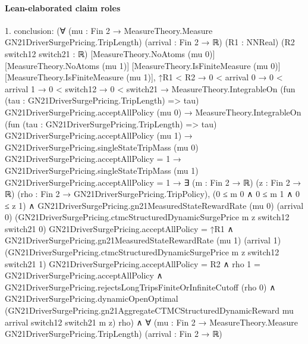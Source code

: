 \documentclass[10pt]{article}
\begin{document}
\paragraph{Lean-elaborated claim roles}\begin{ReviewVerbatim}
1. conclusion: (∀ (mu : Fin 2 → MeasureTheory.Measure GN21DriverSurgePricing.TripLength) (arrival : Fin 2 → ℝ) (R1 : NNReal)
    (R2 switch12 switch21 : ℝ) [MeasureTheory.NoAtoms (mu 0)] [MeasureTheory.NoAtoms (mu 1)]
    [MeasureTheory.IsFiniteMeasure (mu 0)] [MeasureTheory.IsFiniteMeasure (mu 1)],
    ↑R1 < R2 →
      0 < arrival 0 →
        0 < arrival 1 →
          0 < switch12 →
            0 < switch21 →
              MeasureTheory.IntegrableOn (fun (tau : GN21DriverSurgePricing.TripLength) => tau)
                  GN21DriverSurgePricing.acceptAllPolicy (mu 0) →
                MeasureTheory.IntegrableOn (fun (tau : GN21DriverSurgePricing.TripLength) => tau)
                    GN21DriverSurgePricing.acceptAllPolicy (mu 1) →
                  GN21DriverSurgePricing.singleStateTripMass (mu 0) GN21DriverSurgePricing.acceptAllPolicy = 1 →
                    GN21DriverSurgePricing.singleStateTripMass (mu 1) GN21DriverSurgePricing.acceptAllPolicy = 1 →
                      ∃ (m : Fin 2 → ℝ) (z : Fin 2 → ℝ) (rho : Fin 2 → GN21DriverSurgePricing.TripPolicy),
                        (0 ≤ m 0 ∧ 0 ≤ m 1 ∧ 0 ≤ z 1) ∧
                          GN21DriverSurgePricing.gn21MeasuredStateRewardRate (mu 0) (arrival 0)
                                (GN21DriverSurgePricing.ctmcStructuredDynamicSurgePrice m z switch12 switch21 0)
                                GN21DriverSurgePricing.acceptAllPolicy =
                              ↑R1 ∧
                            GN21DriverSurgePricing.gn21MeasuredStateRewardRate (mu 1) (arrival 1)
                                  (GN21DriverSurgePricing.ctmcStructuredDynamicSurgePrice m z switch12 switch21 1)
                                  GN21DriverSurgePricing.acceptAllPolicy =
                                R2 ∧
                              rho 1 = GN21DriverSurgePricing.acceptAllPolicy ∧
                                GN21DriverSurgePricing.rejectsLongTripsFiniteOrInfiniteCutoff (rho 0) ∧
                                  GN21DriverSurgePricing.dynamicOpenOptimal
                                    (GN21DriverSurgePricing.gn21AggregateCTMCStructuredDynamicReward mu arrival switch12
                                      switch21 m z)
                                    rho) ∧
  ∀ (mu : Fin 2 → MeasureTheory.Measure GN21DriverSurgePricing.TripLength) (arrival : Fin 2 → ℝ)

\end{ReviewVerbatim}
\end{document}
